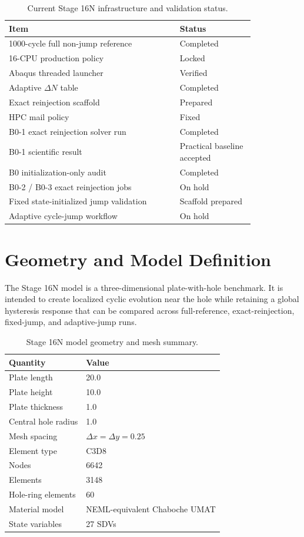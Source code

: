 \documentclass[11pt,a4paper]{article}
\newcommand{\stage}{Stage 16N}
\begin{document}
\begin{table}[H]
\centering
\caption{Current \stage{} infrastructure and validation status.}
\begin{tabular}{p{0.58\linewidth}p{0.25\linewidth}}
\toprule
Item & Status \\
\midrule
1000-cycle full non-jump reference & Completed \\
16-CPU production policy & Locked \\
Abaqus threaded launcher & Verified \\
Adaptive $\Delta N$ table & Completed \\
Exact reinjection scaffold & Prepared \\
HPC mail policy & Fixed \\
B0-1 exact reinjection solver run & Completed \\
B0-1 scientific result & Practical baseline accepted \\
B0 initialization-only audit & Completed \\
B0-2 / B0-3 exact reinjection jobs & On hold \\
Fixed state-initialized jump validation & Scaffold prepared \\
Adaptive cycle-jump workflow & On hold \\
\bottomrule
\end{tabular}
\end{table}

\section{Geometry and Model Definition}

The \stage{} model is a three-dimensional plate-with-hole benchmark. It is intended to create localized cyclic evolution near the hole while retaining a global hysteresis response that can be compared across full-reference, exact-reinjection, fixed-jump, and adaptive-jump runs.

\begin{table}[H]
\centering
\caption{Stage 16N model geometry and mesh summary.}
\begin{tabular}{ll}
\toprule
Quantity & Value \\
\midrule
Plate length & 20.0 \\
Plate height & 10.0 \\
Plate thickness & 1.0 \\
Central hole radius & 1.0 \\
Mesh spacing & $\Delta x = \Delta y = 0.25$ \\
Element type & C3D8 \\
Nodes & 6642 \\
Elements & 3148 \\
Hole-ring elements & 60 \\
Material model & NEML-equivalent Chaboche UMAT \\
State variables & 27 SDVs \\
\bottomrule
\end{tabular}
\end{table}
\end{document}
